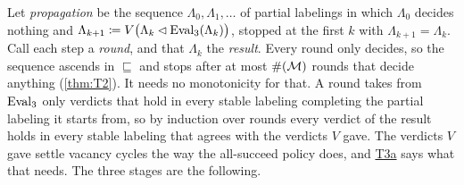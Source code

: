 \documentclass[12pt,a4paper]{article}
\begin{document}
Let \emph{propagation} be the sequence $\Lambda_0, \Lambda_1, \dots$ of partial labelings in which $\Lambda_0$ decides nothing and $\Lambda_{k+1} \coloneqq V\bigl(\Lambda_k \lhd \operatorname{Eval}_3(\Lambda_k)\bigr)$, stopped at the first $k$ with $\Lambda_{k+1} = \Lambda_k$.
Call each step a \emph{round}, and that $\Lambda_k$ the \emph{result}.
Every round only decides, so the sequence ascends in $\sqsubseteq$ and stops after at most $\#(\mathcal{M})$ rounds that decide anything (\cref{thm:T2}).
It needs no monotonicity for that.
A round takes from $\operatorname{Eval}_3$ only verdicts that hold in every stable labeling completing the partial labeling it starts from, so by induction over rounds every verdict of the result holds in every stable labeling that agrees with the verdicts $V$ gave.
The verdicts $V$ gave settle vacancy cycles the way the all-succeed policy does, and \hyperref[thm:T3]{T3a} says what that needs.
The three stages are the following.
\end{document}
